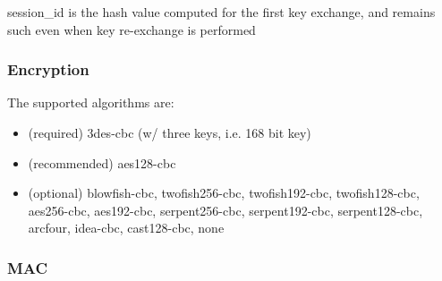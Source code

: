 session\_id is the hash value computed for the first key 
exchange, and remains such even when key re-exchange is 
performed
\subsubsection{Encryption}
The supported algorithms are:
\begin{itemize}
  \item (required) 3des-cbc (w/ three keys, i.e. 168 bit key)
  \item(recommended) aes128-cbc
  \item(optional) blowfish-cbc, twofish256-cbc, twofish192-cbc,
    twofish128-cbc, aes256-cbc, aes192-cbc, serpent256-cbc,
    serpent192-cbc, serpent128-cbc, arcfour, idea-cbc, cast128-cbc,
    none
\end{itemize}

\subsubsection{MAC}
